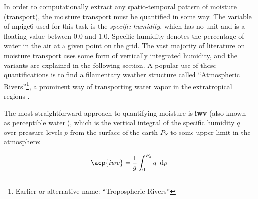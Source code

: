 In order to computationally extract any spatio-temporal pattern of moisture (transport), the moisture transport must be quantified in some way.
The variable of \ac{mpige6} used for this task is the \textit{specific humidity}, which has no unit and is a floating value between $0.0$ and $1.0$. Specific humidity denotes the percentage of water in the air at a given point on the grid. 
The vast majority of literature on moisture transport uses some form of vertically integrated humidity, and the variants are explained in the following section.  
A popular use of these quantifications is to find a filamentary weather structure called \enquote{Atmospheric Rivers}\footnote{Earlier or alternative name: \enquote{Tropospheric Rivers}}, a prominent way of transporting water vapor in the extratropical regions \cite{gimeno_atmospheric_2014}. 


The most straightforward approach to quantifying moisture is \textbf{\ac{iwv}} \cite{gimeno_atmospheric_2014, schluessel_atmospheric_1990, bao_interpretation_2006, neiman_meteorological_2008, zhao_lagrangian_2021, wypych_atmospheric_2018}(also known as perceptible water \cite{wypych_atmospheric_2018}), which is the vertical integral of the specific humidity $q$ over pressure levels $p$ from the surface of the earth $P_S$ to some upper limit in the atmosphere:


\begin{equation}
\label{eq:iwv}
\acp{iwv} = \frac{1}{g} \int^{P_s}_0 q ~\diff p
\end{equation}





